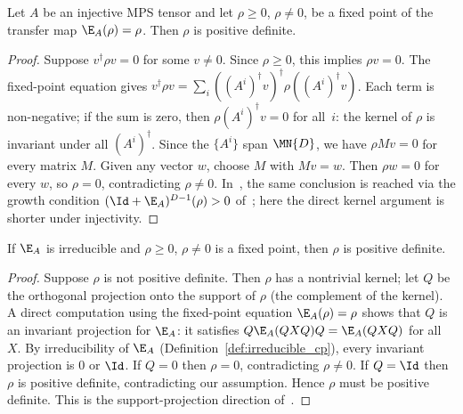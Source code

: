 \begin{theorem}\label{thm:psd_fp_pd}
    \leanok
    Let $A$ be an injective MPS tensor and let $\rho \ge 0$,
    $\rho \neq 0$, be a fixed point of the transfer map
    $\E_A(\rho) = \rho$.
    Then $\rho$ is positive definite.
\end{theorem}

\begin{proof}
    \leanok
    Suppose $v^\dagger \rho v = 0$ for some $v \neq 0$.
    Since $\rho \ge 0$, this implies $\rho v = 0$.
    The fixed-point equation gives
    $v^\dagger \rho v = \sum_i ((A^i)^\dagger v)^\dagger
        \rho ((A^i)^\dagger v)$.
    Each term is non-negative; if the sum is zero, then
    $\rho (A^i)^\dagger v = 0$ for all~$i$:
    the kernel of $\rho$ is invariant under all $(A^i)^\dagger$.
    Since the $\{A^i\}$ span $\MN{D}$, we have $\rho M v = 0$
    for every matrix $M$. Given any vector $w$, choose $M$ with
    $M v = w$. Then $\rho w = 0$ for every $w$, so $\rho = 0$,
    contradicting $\rho \neq 0$.
    In~\cite[Theorem~6.3(2)]{Wolf2012Quantum},
    the same conclusion is reached via the
    growth condition $(\Id + \E_A)^{D-1}(\rho) > 0$
    of~\cite[Theorem~6.2, condition~(2)]{Wolf2012Quantum};
    here the direct kernel argument is shorter under
    injectivity.
\end{proof}

\begin{theorem}\label{thm:psd_fp_pd_irred}
    \leanok
    If $\E_A$ is irreducible and $\rho \ge 0$, $\rho \neq 0$
    is a fixed point, then $\rho$ is positive definite.
\end{theorem}

\begin{proof}
    \leanok
    Suppose $\rho$ is not positive definite.
    Then $\rho$ has a nontrivial kernel; let $Q$ be the
    orthogonal projection onto the support of $\rho$
    (the complement of the kernel).
    A direct computation using the fixed-point equation
    $\E_A(\rho) = \rho$ shows that $Q$ is an invariant
    projection for $\E_A$: it satisfies
    $Q \E_A(Q X Q) Q = \E_A(Q X Q)$ for all~$X$.
    By irreducibility of $\E_A$
    (Definition~\ref{def:irreducible_cp}),
    every invariant projection is $0$ or $\Id$.
    If $Q = 0$ then $\rho = 0$, contradicting $\rho \neq 0$.
    If $Q = \Id$ then $\rho$ is positive definite,
    contradicting our assumption.
    Hence $\rho$ must be positive definite.
    This is the support-projection direction
    of~\cite[Theorem~6.2(1)]{Wolf2012Quantum}.
\end{proof}

